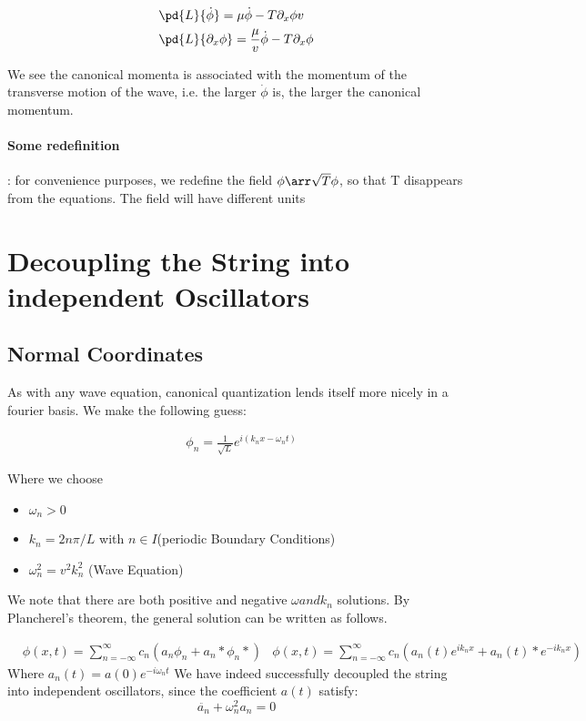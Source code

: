 \begin{align}
    & \pd{L}{\dot{\phi}} = \mu \dot{\phi} - T \partial_x \phi v \\
    & \pd{L}{\partial_x \phi} = \frac{\mu}{v} \dot{\phi} - T \partial_x \phi
\end{align}


We see the canonical momenta is associated with the momentum of the transverse motion of the wave,
i.e. the larger \(\dot{\phi}\) is, the larger the canonical momentum.

\paragraph{Some redefinition}: for convenience purposes, we redefine the field \(\phi \arr \sqrt{T} \phi\),
so that T disappears from the equations. The field will have different units





\section{Decoupling the String into independent Oscillators}

\subsection{Normal Coordinates}

As with any wave equation, canonical quantization lends itself more nicely in a fourier basis.  We make the following guess:

\begin{align}
    & \phi_n = \frac{1}{\sqrt{L}} e^{i(k_n x- \omega_n t)}
\end{align}

Where we choose
\begin{itemize}
    \item \(\omega_n >0\)
    \item \(k_n = 2n \pi/L\) with \(n \in I\)(periodic Boundary Conditions)
    \item \(\omega_n^2 = v^2 k_n^2\) (Wave Equation)
\end{itemize}

We note that there are both positive and negative \(\omega and k_n\) solutions.
By Plancherel's theorem, the general solution can be written as follows.

\begin{align}
    & \phi(x,t)= \sum_{n= -\infty}^{\infty} c_n(a_n \phi_n + a_n* \phi_n*)
    & \phi(x,t)= \sum_{n = -\infty}^{\infty} c_n(a_n(t)e^{ik_n x} + a_n(t)* e^{-ik_n x})
\end{align}
Where \(a_n(t)= a(0)e^{-i \omega_n t}\)
We have indeed successfully decoupled the string into independent oscillators, since the coefficient \(a(t)\) satisfy:
\[\ddot{a_n}+ \omega_n^2 a_n = 0\]

